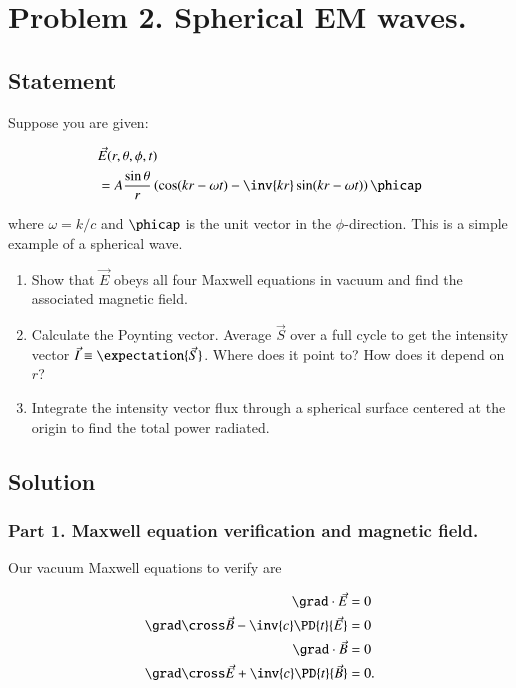 \section{Problem 2.  Spherical EM waves.}

\subsection{Statement}

Suppose you are given:

\begin{equation}\label{eqn:relElectroDynProblemSet4:400}
\begin{aligned}
&\vec{E}(r, \theta, \phi, t) \\
&= A \frac{\sin\theta}{r} \left( \cos(k r - \omega t) - \inv{k r} \sin(k r - \omega t) \right) \phicap
\end{aligned}
\end{equation}

where $\omega = k/c$ and $\phicap$ is the unit vector in the $\phi$-direction.  This is a simple example of a spherical wave.

\begin{enumerate}
\item Show that $\vec{E}$ obeys all four Maxwell equations in vacuum and find the associated magnetic field.
\item Calculate the Poynting vector.  Average $\vec{S}$ over a full cycle to get the intensity vector $\vec{I} \equiv \expectation{\vec{S}}$.  Where does it point to?  How does it depend on $r$?
\item Integrate the intensity vector flux through a spherical surface centered at the origin to find the total power radiated.
\end{enumerate}

\subsection{Solution}

\subsubsection{Part 1.  Maxwell equation verification and magnetic field.}

Our vacuum Maxwell equations to verify are

\begin{align}\label{eqn:relElectroDynProblemSet4:420}
\grad \cdot \vec{E} &= 0 \\
\grad \cross \vec{B} -\inv{c} \PD{t}{\vec{E}} &= 0 \\
\grad \cdot \vec{B} &= 0 \\
\grad \cross \vec{E} +\inv{c} \PD{t}{\vec{B}} &= 0.
\end{align}

